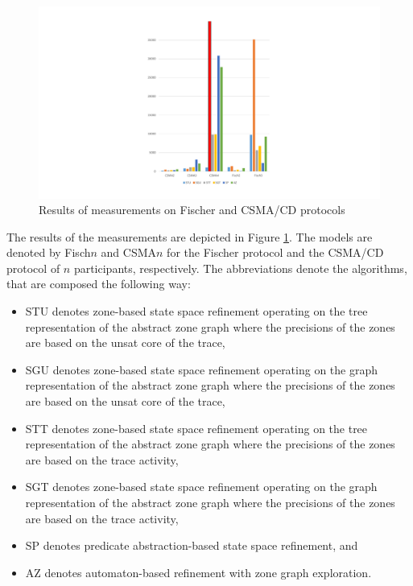 \begin{figure}
	\centering
	\includegraphics[width=\textwidth]{include/figures/diag_fischcsma}
	\caption{Results of measurements on Fischer and CSMA/CD protocols}
	\label{fig:mesurements}
\end{figure}

The results of the measurements are depicted in Figure \ref{fig:mesurements}. The models are denoted by Fisch$n$ and CSMA$n$ for the Fischer protocol and the CSMA/CD protocol of $n$ participants, respectively. The abbreviations denote the algorithms, that are composed the following way:

\begin{itemize}
	\item STU denotes zone-based state space refinement operating on the tree representation of the abstract zone graph where the precisions of the zones are based on the unsat core of the trace,
	\item SGU denotes zone-based state space refinement operating on the graph representation of the abstract zone graph where the precisions of the zones are based on the unsat core of the trace,
	\item STT denotes zone-based state space refinement operating on the tree representation of the abstract zone graph where the precisions of the zones are based on the trace activity,
	\item SGT denotes zone-based state space refinement operating on the graph representation of the abstract zone graph where the precisions of the zones are based on the trace activity,
	\item SP denotes predicate abstraction-based state space refinement, and
	\item AZ denotes automaton-based refinement with zone graph exploration.
\end{itemize}

